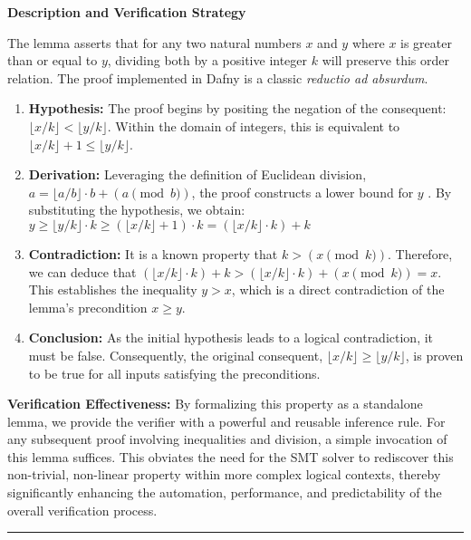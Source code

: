 \documentclass[
  english,
  onecolumn]{article}
\providecommand{\tightlist}{%
  \setlength{\itemsep}{0pt}\setlength{\parskip}{0pt}}
\begin{document}
\textbf{Description and Verification Strategy}

The lemma asserts that for any two natural numbers \(x\) and \(y\) where
\(x\) is greater than or equal to \(y\), dividing both by a positive
integer \(k\) will preserve this order relation. The proof implemented
in Dafny is a classic \emph{reductio ad absurdum}.

\begin{enumerate}
\def\labelenumi{\arabic{enumi}.}
\tightlist
\item
  \textbf{Hypothesis:} The proof begins by positing the negation of the
  consequent: \(\lfloor x/k \rfloor < \lfloor y/k \rfloor\). Within the
  domain of integers, this is equivalent to
  \(\lfloor x/k \rfloor + 1 \le \lfloor y/k \rfloor\).
\item
  \textbf{Derivation:} Leveraging the definition of Euclidean division,
  \(a = \lfloor a/b \rfloor \cdot b + (a \pmod b)\), the proof
  constructs a lower bound for \(y\)
  . By substituting the hypothesis,
  we obtain:
  \(y \ge \lfloor y/k \rfloor \cdot k \ge (\lfloor x/k \rfloor + 1) \cdot k = (\lfloor x/k \rfloor \cdot k) + k\)
\item
  \textbf{Contradiction:} It is a known property that
  \(k > (x \pmod k)\). Therefore, we can deduce that
  \((\lfloor x/k \rfloor \cdot k) + k > (\lfloor x/k \rfloor \cdot k) + (x \pmod k) = x\).
  This establishes the inequality \(y > x\), which is a direct
  contradiction of the lemma's precondition \(x \ge y\).
\item
  \textbf{Conclusion:} As the initial hypothesis leads to a logical
  contradiction, it must be false. Consequently, the original
  consequent, \(\lfloor x/k \rfloor \ge \lfloor y/k \rfloor\), is proven
  to be true for all inputs satisfying the preconditions.
\end{enumerate}

\textbf{Verification Effectiveness:} By formalizing this property as a
standalone lemma, we provide the verifier with a powerful and reusable
inference rule. For any subsequent proof involving inequalities and
division, a simple invocation of this lemma suffices. This obviates the
need for the SMT solver to rediscover this non-trivial, non-linear
property within more complex logical contexts, thereby significantly
enhancing the automation, performance, and predictability of the overall
verification process.

\begin{center}\rule{0.5\linewidth}{0.5pt}\end{center}
\end{document}
